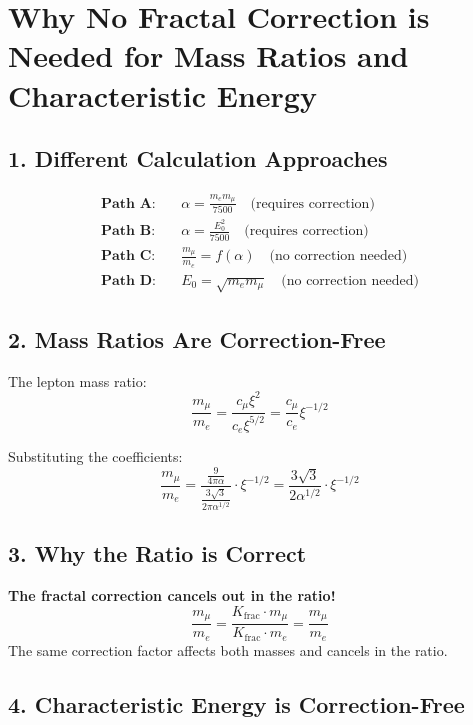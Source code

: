 \documentclass[12pt,a4paper]{article}
\begin{document}
	
	\section*{Why No Fractal Correction is Needed for Mass Ratios and Characteristic Energy}
	
	\subsection*{1. Different Calculation Approaches}
	
	\begin{align*}
		\textbf{Path A:} &\quad \alpha = \frac{m_e m_\mu}{7500} \quad \text{(requires correction)} \\
		\textbf{Path B:} &\quad \alpha = \frac{E_0^2}{7500} \quad \text{(requires correction)} \\
		\textbf{Path C:} &\quad \frac{m_\mu}{m_e} = f(\alpha) \quad \text{(no correction needed)} \\
		\textbf{Path D:} &\quad E_0 = \sqrt{m_e m_\mu} \quad \text{(no correction needed)}
	\end{align*}
	
	\subsection*{2. Mass Ratios Are Correction-Free}
	
	The lepton mass ratio:
	\[
	\frac{m_\mu}{m_e} = \frac{c_\mu \xi^2}{c_e \xi^{5/2}} = \frac{c_\mu}{c_e} \xi^{-1/2}
	\]
	
	Substituting the coefficients:
	\[
	\frac{m_\mu}{m_e} = \frac{\frac{9}{4\pi\alpha}}{\frac{3\sqrt{3}}{2\pi\alpha^{1/2}}} \cdot \xi^{-1/2} = \frac{3\sqrt{3}}{2\alpha^{1/2}} \cdot \xi^{-1/2}
	\]
	
	\subsection*{3. Why the Ratio is Correct}
	
	\begin{tcolorbox}[colback=green!5!white,colframe=green!75!black]
		\textbf{The fractal correction cancels out in the ratio!}
		\[
		\frac{m_\mu}{m_e} = \frac{K_{\text{frac}} \cdot m_\mu}{K_{\text{frac}} \cdot m_e} = \frac{m_\mu}{m_e}
		\]
		The same correction factor affects both masses and cancels in the ratio.
	\end{tcolorbox}
	
	\subsection*{4. Characteristic Energy is Correction-Free}
	
\end{document}
